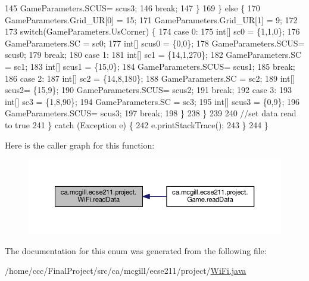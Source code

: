 \begin{DoxyCode}
145             GameParameters.SCUS= scus3;
146             \textcolor{keywordflow}{break};
147         \}
169       \} \textcolor{keywordflow}{else} \{
170         GameParameters.Grid\_UR[0] = 15;
171         GameParameters.Grid\_UR[1] = 9;
172  
173         \textcolor{keywordflow}{switch}(GameParameters.UsCorner) \{
174           \textcolor{keywordflow}{case} 0:
175             \textcolor{keywordtype}{int}[] sc0 = \{1,1,0\};
176             GameParameters.SC = sc0;
177             \textcolor{keywordtype}{int}[] scus0 = \{0,0\};
178             GameParameters.SCUS= scus0;
179             \textcolor{keywordflow}{break};
180           \textcolor{keywordflow}{case} 1:
181             \textcolor{keywordtype}{int}[] sc1 = \{14,1,270\};
182             GameParameters.SC = sc1;
183             \textcolor{keywordtype}{int}[] scus1 = \{15,0\};
184             GameParameters.SCUS= scus1;
185             \textcolor{keywordflow}{break};
186           \textcolor{keywordflow}{case} 2:
187             \textcolor{keywordtype}{int}[] sc2 = \{14,8,180\};
188             GameParameters.SC = sc2;
189             \textcolor{keywordtype}{int}[] scus2= \{15,9\};
190             GameParameters.SCUS= scus2;
191             \textcolor{keywordflow}{break};
192           \textcolor{keywordflow}{case} 3:
193             \textcolor{keywordtype}{int}[] sc3 = \{1,8,90\};
194             GameParameters.SC = sc3;
195             \textcolor{keywordtype}{int}[] scus3 = \{0,9\};
196             GameParameters.SCUS= scus3;
197             \textcolor{keywordflow}{break};
198         \}
238       \}
239       
240       \textcolor{comment}{//set data read to true}
241     \} \textcolor{keywordflow}{catch} (Exception e) \{
242       e.printStackTrace();
243     \}
244   \}
\end{DoxyCode}
Here is the caller graph for this function\+:\nopagebreak
\begin{figure}[H]
\begin{center}
\leavevmode
\includegraphics[width=350pt]{enumca_1_1mcgill_1_1ecse211_1_1project_1_1_wi_fi_a3488726983cda70dbde6f05c9c762f16_icgraph}
\end{center}
\end{figure}


The documentation for this enum was generated from the following file\+:\begin{DoxyCompactItemize}
\item 
/home/ccc/\+Final\+Project/src/ca/mcgill/ecse211/project/\hyperlink{_wi_fi_8java}{Wi\+Fi.\+java}\end{DoxyCompactItemize}

